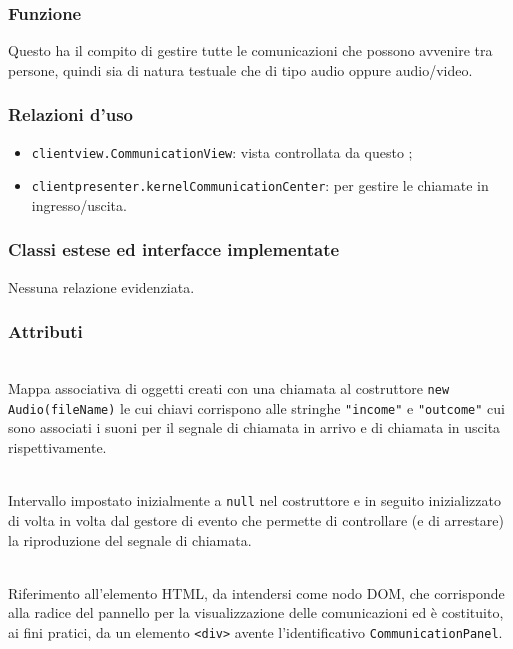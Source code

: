 \subsubsection*{Funzione}
Questo  ha il compito di gestire tutte le comunicazioni che possono avvenire tra persone, quindi sia di natura testuale che di tipo audio oppure audio/video.

\subsubsection*{Relazioni d'uso}
\begin{itemize}
  \item \texttt{clientview.CommunicationView}: vista controllata da questo ;
  \item \texttt{clientpresenter.kernelCommunicationCenter}: per gestire le chiamate in ingresso/uscita.
\end{itemize}

\subsubsection*{Classi estese ed interfacce implementate}
Nessuna relazione evidenziata.

\subsubsection*{Attributi}
\begin{description}

  \item{}\\
  Mappa associativa di oggetti creati con una chiamata al costruttore \verb'new Audio(fileName)' le cui chiavi corrispono alle stringhe \verb'"income"' e \verb'"outcome"' cui sono associati i suoni per il segnale di chiamata in arrivo e di chiamata in uscita rispettivamente.
  
  \item{}\\
  Intervallo impostato inizialmente a \verb'null' nel costruttore e in seguito inizializzato di volta in volta dal gestore di evento  che permette di controllare (e di arrestare) la riproduzione del segnale di chiamata.
  
\item{}\\
Riferimento all'elemento HTML, da intendersi come nodo DOM, che corrisponde alla radice del pannello per la visualizzazione delle comunicazioni ed è costituito, ai fini pratici, da un elemento \verb'<div>' avente l'identificativo \verb'CommunicationPanel'.

\end{description}

